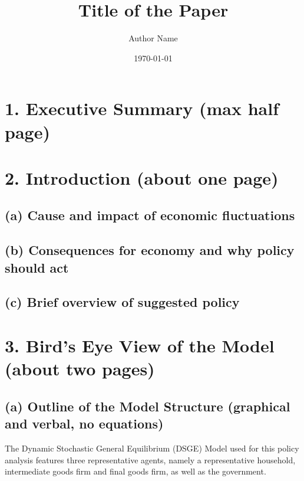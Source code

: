 \documentclass[12pt]{article}
\title{Title of the Paper}
\author{Author Name}
\date{\today}
\begin{document}
\maketitle
\section*{1. Executive Summary (max half page)}

\section*{2. Introduction (about one page)}
\subsection*{(a) Cause and impact of economic fluctuations}

\subsection*{(b) Consequences for economy and why policy should act}

\subsection*{(c) Brief overview of suggested policy}




\section*{3. Bird’s Eye View of the Model (about two pages)}



\subsection*{(a) Outline of the Model Structure (graphical and verbal, no equations)}
The Dynamic Stochastic General Equilibrium (DSGE) Model used for this policy analysis features
three representative agents, namely a representative household, intermediate goods firm and final goods firm, 
as well as the government. 
\end{document}
